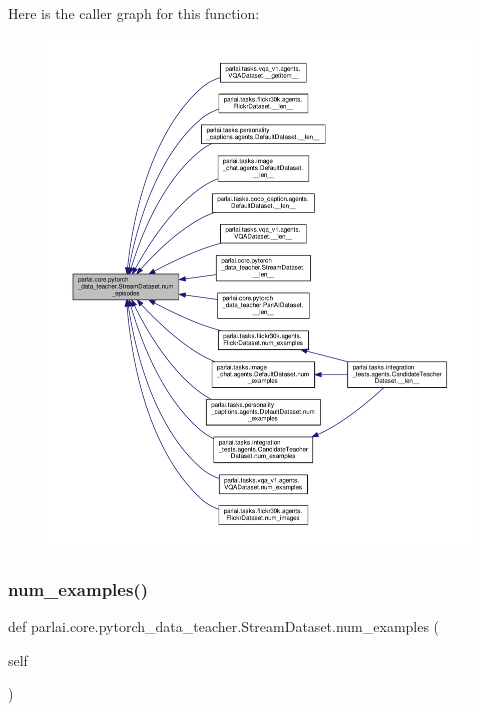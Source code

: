 Here is the caller graph for this function\+:
\nopagebreak
\begin{figure}[H]
\begin{center}
\leavevmode
\includegraphics[width=350pt]{classparlai_1_1core_1_1pytorch__data__teacher_1_1StreamDataset_affcb2b9a39beb9c5504bb1051652d1e7_icgraph}
\end{center}
\end{figure}
\mbox{\label{classparlai_1_1core_1_1pytorch__data__teacher_1_1StreamDataset_a4f2bbfd2bc046d8ff2f59153eec79b46}} 
\subsubsection{\texorpdfstring{num\+\_\+examples()}{num\_examples()}}
{\footnotesize\ttfamily def parlai.\+core.\+pytorch\+\_\+data\+\_\+teacher.\+Stream\+Dataset.\+num\+\_\+examples (\begin{DoxyParamCaption}\item[{}]{self }\end{DoxyParamCaption})}

